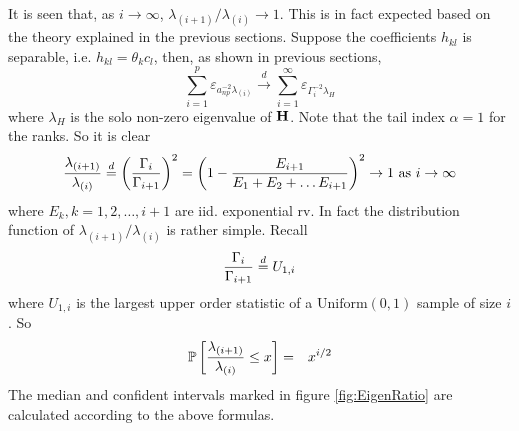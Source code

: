 \documentclass[11pt,reqno]{amsart}
\newcommand{\E}{\mathbb{E}}
\renewcommand{\P}{\mathbb{P}}
\newcommand{\1}{\mathds{1}}
\newcommand{\0}{\boldsymbol{0}}
\newcommand{\pp}[1]{\varepsilon_{#1}}
\newcommand{\4}{\mathchoice{\mskip1.5mu}{\mskip1.5mu}{}{}}
\newcommand{\5}{\mathchoice{\mskip-1.5mu}{\mskip-1.5mu}{}{}}
\newcommand{\2}{\penalty250\mskip\thickmuskip\mskip-\thinmuskip} %
\begin{document}
It is seen that, as $i \to \infty$, $\lambda_{(i+1)} / \lambda_{(i)}
\to 1$. This is in fact expected based on the theory explained in the
previous sections. Suppose the coefficients $h_{kl}$ is separable,
i.e. $h_{kl} = \theta_k c_l$, then, as shown in previous sections,
\[
\sum_{i=1}^p \pp{a_{np}^{-2}\lambda_{(i)}} \overset{d}{\to}
\sum_{i=1}^\infty \pp{\Gamma_i^{-2} \lambda_H}
\]
where $\lambda_H$ is the solo non-zero eigenvalue of $\bf H$. Note
that the tail index $\alpha=1$ for the ranks. So it is clear
\[
{\lambda_{(i+1)} \over 
  \lambda_{(i)}} \overset{d}{=} \left({\Gamma_i \over
    \Gamma_{i+1}}\right)^{2}=\left(1 - {E_{i+1} \over E_1 + E_2
    + \dots E_{i+1}}\right)^{2} \to 1 \text{ as } i \to \infty
\]
where $E_k, k=1,2,\dots,i+1$ are iid. exponential rv. In fact the
distribution function of $\lambda_{(i+1)} / \lambda_{(i)}$ is rather
simple. Recall
\[
{\Gamma_{i} \over \Gamma_{i+1}} \overset{d}{=} U_{1, i}
\]
where $U_{1, i}$ is the largest upper order statistic of a
$\text{Uniform}(0, 1)$ sample of size $i$. So
\begin{eqnarray*}
\P\left[{\lambda_{(i+1)} \over \lambda_{(i)}} \leq x \right] &=& x^{i/2}
\end{eqnarray*}
The median and confident intervals marked in figure
\ref{fig:EigenRatio} are calculated according to the above formulas.
\end{document}
